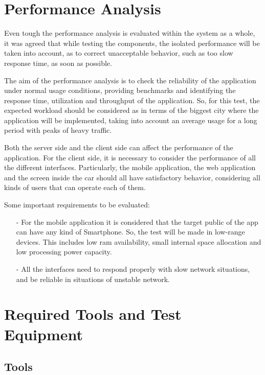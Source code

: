 \documentclass[a4paper]{article}
\begin{document}
\section{Performance Analysis}

Even tough the performance analysis is evaluated within the system as a whole, it was agreed that while testing the components, the isolated performance will be taken into account, as to correct unacceptable behavior, such as too slow response time, as soon as possible. 

The aim of the performance analysis is to check the reliability of the application under normal usage conditions, providing benchmarks and identifying the response time, utilization and throughput of the application. So, for this test, the expected workload should be considered as in terms of the biggest city where the application will be implemented, taking into account an average usage for a long period with peaks of heavy traffic. 

Both the server side and the client side can affect the performance of the application. For the client side,  it is necessary to consider the performance of all the different interfaces. Particularly, the mobile application, the web application and the screen inside the car should all have satisfactory behavior, considering all kinds of users that can operate each of them. 

Some important requirements to be evaluated:
\begin{itemize}
\item[-] For the mobile application it is considered that the target public of the app can have any kind of Smartphone. So, the test will be made in low-range devices. This includes low ram availability, small internal space allocation and low processing power capacity.
\item[-] All the interfaces need to respond properly with slow network situations, and be reliable in situations of unstable network. 

\end{itemize}
\newpage


\section{Required Tools and Test Equipment}
\subsection{Tools}
\end{document}
